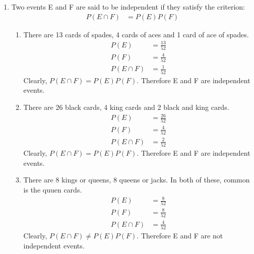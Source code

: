 \renewcommand{\theequation}{\theenumi}
\begin{enumerate}[label=\thesection.\arabic*.,ref=\thesection.\theenumi]
\item Two events E and F are said to be independent if they satisfy the criterion:
\begin{align}
P(E \cap F) &= P(E)P(F)
\end{align}
\begin{enumerate}
\item There are 13 cards of spades, 4 cards of aces and 1 card of ace of spades.
\begin{align}
P(E) &= \frac{13}{52}\\
P(F) &= \frac{4}{52}\\
P(E \cap F) &= \frac{1}{52}
\end{align}
Clearly, $P(E \cap F)= P(E)P(F)$. Therefore E and F are independent events.
\item There are 26 black cards, 4 king cards and 2 black and king cards.
\begin{align}
P(E) &= \frac{26}{52}\\
P(F) &= \frac{4}{52}\\
P(E \cap F) &= \frac{2}{52}
\end{align}
Clearly, $P(E \cap F)= P(E)P(F)$. Therefore E and F are independent events.
\item There are 8 kings or queens, 8 queens or jacks. In both of these, common is the quuen cards. 
\begin{align}
P(E) &= \frac{8}{52}\\
P(F) &= \frac{8}{52}\\
P(E \cap F) &= \frac{4}{52}
\end{align}
Clearly, $P(E \cap F) \neq P(E)P(F)$. Therefore E and F are not independent events.
\end{enumerate}

\end{enumerate}